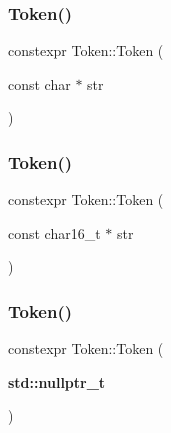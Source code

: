 \mbox{\label{class_token_a344a67da48166ca3809eb253f0c60e64}} 
\subsubsection{\texorpdfstring{Token()}{Token()}\hspace{0.1cm}{\footnotesize\ttfamily [3/16]}}
{\footnotesize\ttfamily constexpr Token\+::\+Token (\begin{DoxyParamCaption}\item[{const char $\ast$}]{str }\end{DoxyParamCaption})\hspace{0.3cm}{\ttfamily [inline]}}

\mbox{\label{class_token_aeb65258a7c79cb54feb7633e89281897}} 
\subsubsection{\texorpdfstring{Token()}{Token()}\hspace{0.1cm}{\footnotesize\ttfamily [4/16]}}
{\footnotesize\ttfamily constexpr Token\+::\+Token (\begin{DoxyParamCaption}\item[{const char16\+\_\+t $\ast$}]{str }\end{DoxyParamCaption})\hspace{0.3cm}{\ttfamily [inline]}}

\mbox{\label{class_token_a8d79a7b0e4e2be8f481096f85c4431f3}} 
\subsubsection{\texorpdfstring{Token()}{Token()}\hspace{0.1cm}{\footnotesize\ttfamily [5/16]}}
{\footnotesize\ttfamily constexpr Token\+::\+Token (\begin{DoxyParamCaption}\item[{\textbf{ std\+::nullptr\+\_\+t}}]{ }\end{DoxyParamCaption})\hspace{0.3cm}{\ttfamily [inline]}}

\mbox{\label{class_token_aa22bec7203c8206f34233f17e41c3187}} 
